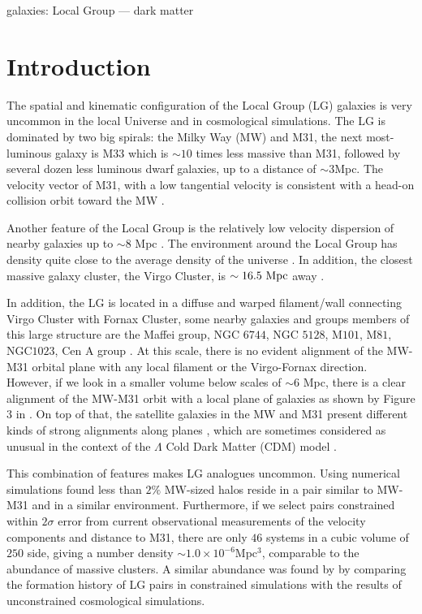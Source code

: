 \documentclass{emulateapj}
\newcommand{\mpc}{\rm{Mpc}}
\newcommand{\hmpc}{{\ifmmode{h^{-1}{\rm Mpc}}\else{$h^{-1}$Mpc }\fi}}
\begin{document}
\begin{keywords}
{galaxies: Local Group --- dark matter}
\end{keywords}


\section{Introduction}
\label{sec:intro}


The spatial and kinematic configuration of the Local Group
(LG) galaxies is very uncommon in the local Universe and in cosmological
simulations. 
The LG is dominated by two big spirals: the Milky Way (MW) and M31, the next
most-luminous galaxy is M33 which is $\sim 10$ times less massive than
M31, followed by several dozen less luminous dwarf galaxies, up to a
distance of $\sim 3$\mpc.   
The velocity vector of M31, with a low
tangential velocity is consistent with a head-on collision orbit toward
the MW
\citep{2008MNRAS.386..461C,2012ApJ...753....8V,2012ApJ...753....7S}.   

Another feature of the Local Group is the relatively low velocity
dispersion of nearby galaxies up to $\sim 8$ Mpc \citep[][and
  references therein]{1975ApJ...196..313S,2011MNRAS.415L..16A}. 
The environment around the Local Group has density quite close to the
average density of the universe
\citep{2003ApJ...596...19K,2005AJ....129..178K}. 
In addition, the closest massive galaxy cluster, the Virgo Cluster, is
$\sim 16.5\ \mpc$ away \citep{2007ApJ...655..144M}.   

In addition, the LG is located in a diffuse and
warped filament/wall connecting Virgo Cluster with Fornax Cluster, some
nearby galaxies and groups members of this large structure are the
Maffei group, NGC $6744$, NGC $5128$, M$101$, M$81$, NGC$1023$, Cen A
group \citep{2013AJ....146...69C}.
At this scale, there is no evident alignment of the MW-M31 orbital
plane with any local filament or the Virgo-Fornax direction. However,
if we look in a smaller volume below scales of $\sim 6$ \mpc, there is
a clear alignment of the MW-M31 orbit with a local plane of galaxies
as shown by Figure $3$ in \citet{2013AJ....146...69C}. On top of that,
the satellite galaxies in the MW and M31 present different kinds of
strong alignments along planes \citep{Pawlowski2013,Shaya2013}, which
are sometimes considered as unusual in the context of the $\Lambda$
Cold Dark Matter (CDM) model \citep{Pawlowski2012}. 


This combination of features makes LG analogues uncommon. 
Using numerical simulations \citet{lganalogues} found less than
$2\%$ MW-sized halos reside in a pair similar to MW-M31 and in a
similar environment. 
Furthermore, if we select pairs constrained
within $2\sigma$ error from current observational measurements of the
velocity components and distance to M31, there are only $46$ systems
in a cubic volume of $250$ \hmpc side, giving a number density $\sim
1.0\times 10^{-6}$Mpc$^{3}$, comparable to the abundance of massive
clusters. 
A similar abundance was found by \cite{ForeroRomero2011} by comparing the
formation history of LG pairs in constrained simulations with the
results of unconstrained cosmological simulations.
\end{document}
